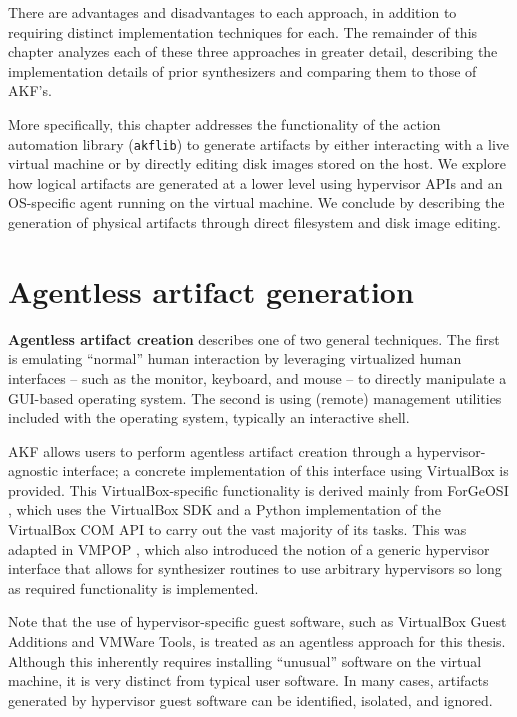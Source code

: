 There are advantages and disadvantages to each approach, in addition to
requiring distinct implementation techniques for each. The remainder of
this chapter analyzes each of these three approaches in greater detail,
describing the implementation details of prior synthesizers and
comparing them to those of AKF's.

More specifically, this chapter addresses the functionality of the
action automation library (\passthrough{\lstinline!akflib!}) to generate
artifacts by either interacting with a live virtual machine or by
directly editing disk images stored on the host. We explore how logical
artifacts are generated at a lower level using hypervisor APIs and an
OS-specific agent running on the virtual machine. We conclude by
describing the generation of physical artifacts through direct
filesystem and disk image editing.

\section{Agentless artifact
generation}\label{agentless-artifact-generation}

\textbf{Agentless artifact creation} describes one of two general
techniques. The first is emulating ``normal'' human interaction by
leveraging virtualized human interfaces -- such as the monitor,
keyboard, and mouse -- to directly manipulate a GUI-based operating
system. The second is using (remote) management utilities included with
the operating system, typically an interactive shell.

AKF allows users to perform agentless artifact creation through a
hypervisor-agnostic interface; a concrete implementation of this
interface using VirtualBox is provided. This VirtualBox-specific
functionality is derived mainly from ForGeOSI
\cite{maxfraggMaxfraggForGeOSI2023}, which uses the VirtualBox SDK
and a Python implementation of the VirtualBox COM API
\cite{larsonSethmlarsonVirtualboxpython2025} to carry out the vast
majority of its tasks. This was adapted in VMPOP
\cite{parkTREDEVMPOPCultivating2018}, which also introduced the
notion of a generic hypervisor interface that allows for synthesizer
routines to use arbitrary hypervisors so long as required functionality
is implemented.

Note that the use of hypervisor-specific guest software, such as
VirtualBox Guest Additions and VMWare Tools, is treated as an agentless
approach for this thesis. Although this inherently requires installing
``unusual'' software on the virtual machine, it is very distinct from
typical user software. In many cases, artifacts generated by hypervisor
guest software can be identified, isolated, and ignored.

